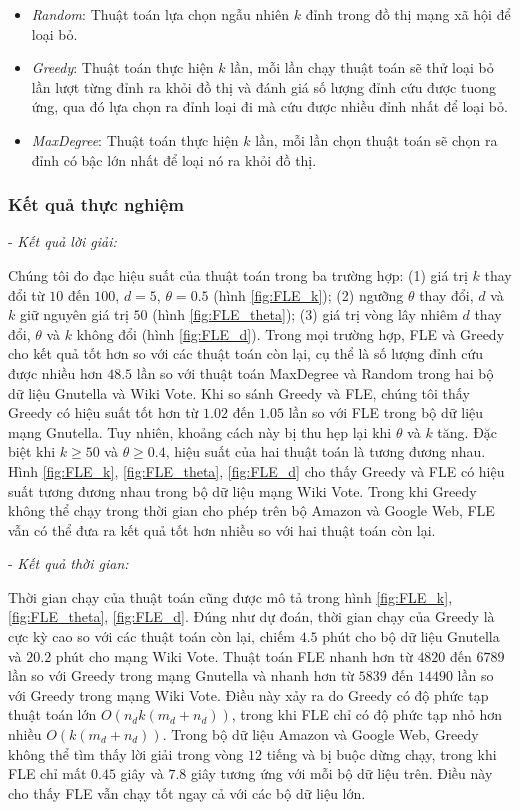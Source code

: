 \begin{itemize}
	\item {\itshape Random}: Thuật toán lựa chọn ngẫu nhiên $k$ đỉnh trong đồ thị mạng xã hội để loại bỏ.
	\item {\itshape Greedy}: Thuật toán thực hiện $k$ lần, mỗi lần chạy thuật toán sẽ thử loại bỏ lần lượt từng đỉnh ra khỏi đồ thị và đánh giá số lượng đỉnh cứu được tuong ứng, qua đó lựa chọn ra đỉnh loại đi mà cứu được nhiều đỉnh nhất để loại bỏ.
	\item {\itshape MaxDegree}: Thuật toán thực hiện $k$ lần, mỗi lần chọn thuật toán sẽ chọn ra đỉnh có bậc lớn nhất để loại nó ra khỏi đồ thị. 
\end{itemize} 

\subsubsection{Kết quả thực nghiệm}

- {\itshape Kết quả lời giải:}

Chúng tôi đo đạc hiệu suất của thuật toán trong ba trường hợp: (1) giá trị $k$ thay đổi từ $10$ đến $100$, $d=5$, $\theta=0.5$ (hình \ref{fig:FLE_k}); (2) ngưỡng $\theta$ thay đổi, $d$ và $k$ giữ nguyên giá trị $50$ (hình \ref{fig:FLE_theta}); (3) giá trị vòng lây nhiêm $d$ thay đổi, $\theta$ và $k$ không đổi (hình \ref{fig:FLE_d}). Trong mọi trường hợp, FLE và Greedy cho kết quả tốt hơn so với các thuật toán còn lại, cụ thể là số lượng đỉnh cứu được nhiều hơn $48.5$ lần so với thuật toán MaxDegree và Random trong hai bộ dữ liệu Gnutella và Wiki Vote. Khi so sánh Greedy và FLE, chúng tôi thấy Greedy có hiệu suất tốt hơn từ $1.02$ đến $1.05$ lần so với FLE trong bộ dữ liệu mạng Gnutella. Tuy nhiên, khoảng cách này bị thu hẹp lại khi $\theta$ và $k$ tăng. Đặc biệt khi $k \geq 50$ và $\theta \geq 0.4$, hiệu suất của hai thuật toán là tương đương nhau. Hình \ref{fig:FLE_k}, \ref{fig:FLE_theta}, \ref{fig:FLE_d} cho thấy Greedy và FLE có hiệu suất tương đương nhau trong bộ dữ liệu mạng Wiki Vote. Trong khi Greedy không thể chạy trong thời gian cho phép trên bộ Amazon và Google Web, FLE vẫn có thể đưa ra kết quả tốt hơn nhiều so với hai thuật toán còn lại.

- {\itshape Kết quả thời gian:}

Thời gian chạy của thuật toán cũng được mô tả trong hình \ref{fig:FLE_k}, \ref{fig:FLE_theta}, \ref{fig:FLE_d}. Đúng như dự đoán, thời gian chạy của Greedy là cực kỳ cao so với các thuật toán còn lại, chiếm $4.5$ phút cho bộ dữ liệu Gnutella và $20.2$ phút cho mạng Wiki Vote. Thuật toán FLE nhanh hơn từ $4820$ đến $6789$ lần so với Greedy trong mạng Gnutella và nhanh hơn từ $5839$ đến $14490$ lần so với Greedy trong mạng Wiki Vote. Điều này xảy ra do Greedy có độ phức tạp thuật toán lớn $O(n_{d}k(m_{d}+n_{d}))$, trong khi FLE chỉ có độ phức tạp nhỏ hơn nhiều $O(k(m_{d}+n_{d}))$. Trong bộ dữ liệu Amazon và Google Web, Greedy không thể tìm thấy lời giải trong vòng $12$ tiếng và bị buộc dừng chạy, trong khi FLE chỉ mất $0.45$ giây và $7.8$ giây tương ứng với mỗi bộ dữ liệu trên. Điều này cho thấy FLE vẫn chạy tốt ngay cả với các bộ dữ liệu lớn.

